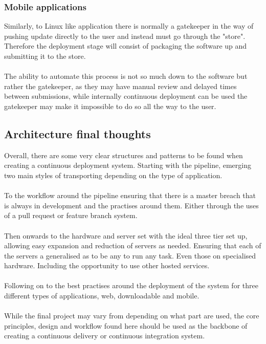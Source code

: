 \subsubsection{Mobile applications}

Similarly, to Linux like application there is normally a gatekeeper in the way of pushing update directly to the user and instead must go through the "store". Therefore the deployment stage will consist of packaging the software up and submitting it to the store. 
\\\\
The ability to automate this process is not so much down to the software but rather the gatekeeper, as they may have manual review and delayed times between submissions, while internally continuous deployment can be used the gatekeeper may make it impossible to do so all the way to the user.

\subsection{Architecture final thoughts}

Overall, there are some very clear structures and patterns to be found when creating a continuous deployment system. Starting with the pipeline, emerging two main styles of transporting depending on the type of application.
\\\\
To the workflow around the pipeline ensuring that there is a master breach that is always in development and the practises around them. Either through the uses of a pull request or feature branch system.
\\\\
Then onwards to the hardware and server set with the ideal three tier set up, allowing easy expansion and reduction of servers as needed. Ensuring that each of the servers a generalised as to be any to run any task. Even those on specialised hardware. Including the opportunity to use other hosted services.
\\\\
Following on to the best practises around the deployment of the system for three different types of applications, web, downloadable and mobile.  
\\\\
While the final project may vary from depending on what part are used, the core principles, design and workflow found here should be used as the backbone of creating a continuous delivery or continuous integration system.